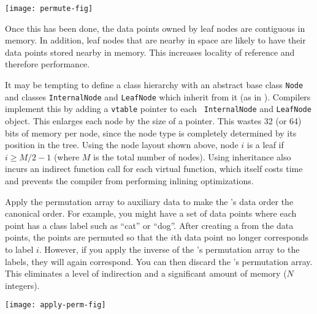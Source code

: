 \nonumberparagraphs
\begin{center}
  \texttt{[image: permute-fig]}
\end{center}
\numberparagraphs

Once this has been done, the data points owned by leaf nodes are
contiguous in memory.  In addition, leaf nodes that are nearby in
space are likely to have their data points stored nearby in memory.
This increases locality of reference and therefore performance.



\label{trick:nocpp}
It may be tempting to define a class hierarchy with an abstract base
class {\tt Node} and classes {\tt InternalNode} and {\tt LeafNode}
which inherit from it (as in ).  Compilers
implement this by adding a {\tt vtable} pointer to each {\tt
InternalNode} and {\tt LeafNode} object.  This enlarges each node by
the size of a pointer.  This wastes 32 (or 64) bits of memory per
node, since the node type is completely determined by its position in
the tree.  Using the node layout shown above, node $i$ is a leaf if $i
\ge M/2 - 1$ (where $M$ is the total number of nodes).  Using
inheritance also incurs an indirect function call for each virtual
function, which itself costs time and prevents the compiler from
performing inlining optimizations.




\label{trick:noperm}

Apply the permutation array to auxiliary data to make the \kdtree's
data order the canonical order.
For example, you might have a set of data points where each point has
a class label such as ``cat'' or ``dog''.  After creating a \kdtree
from the data points, the points are permuted so that the $i$th data
point no longer corresponds to label $i$.  However, if you apply the
inverse of the \kdtree's permutation array to the labels, they will
again correspond.  You can then discard the \kdtree's permutation
array.  This eliminates a level of indirection and a significant
amount of memory ($N$ integers).

\nonumberparagraphs
\begin{center}
  \texttt{[image: apply-perm-fig]}
\end{center}
\numberparagraphs




